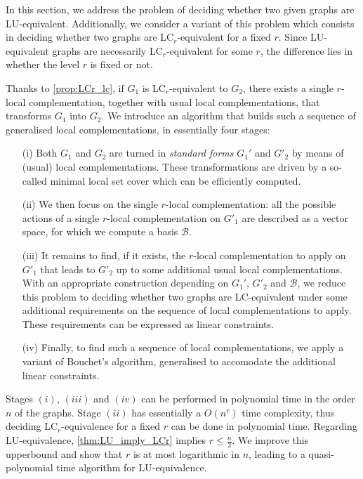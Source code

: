 \documentclass[a4paper,UKenglish,cleveref,autoref,thm-restate]{arxiv}
\begin{document}
In this section, we address the problem of deciding whether two given graphs are LU-equivalent. Additionally, we  consider a variant of this problem which consists in deciding whether two graphs are LC$_r$-equivalent for a fixed $r$.  Since LU-equivalent graphs are necessarily LC$_r$-equivalent for some $r$, the difference lies in whether the level $r$ is fixed or not. 

Thanks to \cref{prop:LCr_lc}, if $G_1$ is  LC$_r$-equivalent to $G_2$, there exists a single $r$-local complementation, together with usual local complementations, that transforms $G_1$ into $G_2$. We introduce an algorithm that builds such a sequence of generalised local complementations, in essentially four stages: 
\begin{itemize}
\item[(i)] Both $G_1$ and $G_2$ are turned in \emph{standard forms} $G_1'$ and $G'_2$ by means of (usual) local complementations. These transformations are driven by a so-called  minimal local set cover which can be efficiently computed.  
\item[(ii)] We then focus on the single $r$-local complementation: all the possible actions of a single $r$-local complementation on $G'_1$ are described as a vector space, for which we compute a basis $\mathcal B$.  
\item[(iii)] It remains to find, if it exists, the $r$-local complementation to apply on $G'_1$ that leads to $G'_2$ up to some additional usual local complementations. With an appropriate construction depending on $G_1'$, $G'_2$ and $\mathcal B$, we reduce this problem to deciding whether two graphs are LC-equivalent under some additional requirements  on the sequence of local complementations to apply. These requirements can be expressed as linear constraints.
\item [(iv)] Finally, to find such a sequence of local complementations, we apply a variant of Bouchet's algorithm, generalised to accomodate the additional linear constraints. 
\end{itemize}

Stages $(i)$, $(iii)$ and $(iv)$ can be performed in polynomial time in the order $n$ of the graphs. Stage $(ii)$ has essentially a $O(n^r)$ time complexity, thus deciding LC$_r$-equivalence for a fixed $r$ can be done in polynomial time. Regarding LU-equivalence, \cref{thm:LU_imply_LCr} implies $r\le \frac n2$. We improve this upperbound and show that $r$ is at most logarithmic in $n$, leading to a quasi-polynomial time algorithm for LU-equivalence. 
\end{document}
